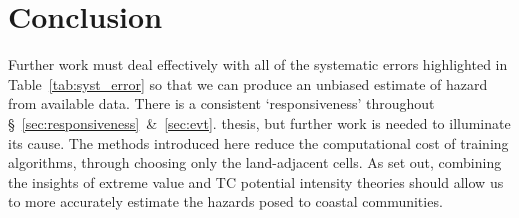 \section{Conclusion}
\label{sec:8_Conclusion}


Further work must deal effectively with all of the systematic errors
highlighted in Table~\ref{tab:syst_error} so that we can produce
an unbiased estimate of hazard from available data.
There is a consistent `responsiveness' throughout §~\ref{sec:responsiveness}~&~\ref{sec:evt}.
thesis, but further work is needed to illuminate its cause.
The methods introduced here reduce the computational cost
of training algorithms, through choosing only the
land-adjacent cells.
As set out, combining the insights of
extreme value and TC potential intensity theories should allow
us to more accurately estimate the hazards posed to coastal communities.
